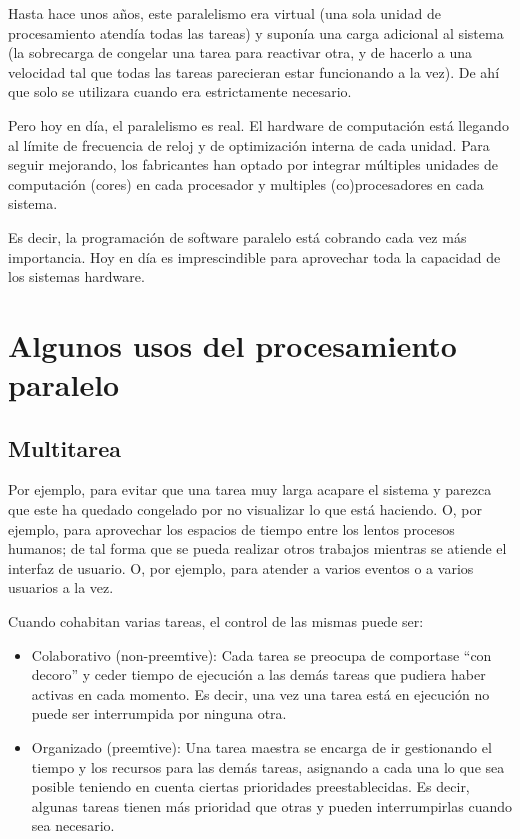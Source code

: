 \documentclass[spanish,12pt,a4paper,final,oneside]{book}
\begin{document}
Hasta hace unos años, este paralelismo era virtual (una sola unidad de procesamiento atendía todas las tareas) y suponía una carga adicional al sistema (la sobrecarga de congelar una tarea para reactivar otra, y de hacerlo a una velocidad tal que todas las tareas parecieran estar funcionando a la vez). De ahí que solo se utilizara cuando era estrictamente necesario.

Pero hoy en día, el paralelismo es real. El hardware de computación está llegando al límite de frecuencia de reloj y de optimización interna de cada unidad. Para seguir mejorando, los fabricantes han optado por integrar múltiples unidades de computación (cores) en cada procesador y multiples (co)procesadores en cada sistema.

Es decir, la programación de software paralelo está cobrando cada vez más importancia. Hoy en día es imprescindible para aprovechar toda la capacidad de los sistemas hardware.

\section{Algunos usos del procesamiento paralelo}


\subsection{Multitarea}
Por ejemplo, para evitar que una tarea muy larga acapare el sistema y parezca que este ha quedado congelado por no visualizar lo que está haciendo. O, por ejemplo, para aprovechar los espacios de tiempo entre los lentos procesos humanos; de tal forma que se pueda realizar otros trabajos mientras se atiende el interfaz de usuario. O, por ejemplo, para atender a varios eventos o a varios usuarios a la vez.

Cuando cohabitan varias tareas, el control de las mismas puede ser:
\begin{itemize}
\item Colaborativo (non-preemtive): Cada tarea se preocupa de comportase ``con decoro'' y ceder tiempo de ejecución a las demás tareas que pudiera haber activas en cada momento. Es decir, una vez una tarea está en ejecución no puede ser interrumpida por ninguna otra.
\item Organizado (preemtive): Una tarea maestra se encarga de ir gestionando el tiempo y los recursos para las demás tareas, asignando a cada una lo que sea posible teniendo en cuenta ciertas prioridades preestablecidas. Es decir, algunas tareas tienen más prioridad que otras y pueden interrumpirlas cuando sea necesario.
\end{itemize}
\end{document}
